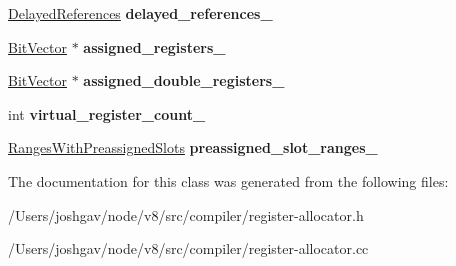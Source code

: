 \begin{DoxyCompactItemize}
\item 
\hyperlink{classv8_1_1internal_1_1_zone_vector}{Delayed\+References} {\bfseries delayed\+\_\+references\+\_\+}\hypertarget{classv8_1_1internal_1_1compiler_1_1_register_allocation_data_ae801790cb5bb3c88a7d189bdfa41f46c}{}\label{classv8_1_1internal_1_1compiler_1_1_register_allocation_data_ae801790cb5bb3c88a7d189bdfa41f46c}

\item 
\hyperlink{classv8_1_1internal_1_1_bit_vector}{Bit\+Vector} $\ast$ {\bfseries assigned\+\_\+registers\+\_\+}\hypertarget{classv8_1_1internal_1_1compiler_1_1_register_allocation_data_a637e49b748733cce53398c61b59257fd}{}\label{classv8_1_1internal_1_1compiler_1_1_register_allocation_data_a637e49b748733cce53398c61b59257fd}

\item 
\hyperlink{classv8_1_1internal_1_1_bit_vector}{Bit\+Vector} $\ast$ {\bfseries assigned\+\_\+double\+\_\+registers\+\_\+}\hypertarget{classv8_1_1internal_1_1compiler_1_1_register_allocation_data_ab1f3e5c2e62b10382bb52433aec20bd3}{}\label{classv8_1_1internal_1_1compiler_1_1_register_allocation_data_ab1f3e5c2e62b10382bb52433aec20bd3}

\item 
int {\bfseries virtual\+\_\+register\+\_\+count\+\_\+}\hypertarget{classv8_1_1internal_1_1compiler_1_1_register_allocation_data_aa86ead6a6b155c8ee4d0d13448e35adc}{}\label{classv8_1_1internal_1_1compiler_1_1_register_allocation_data_aa86ead6a6b155c8ee4d0d13448e35adc}

\item 
\hyperlink{classv8_1_1internal_1_1_zone_vector}{Ranges\+With\+Preassigned\+Slots} {\bfseries preassigned\+\_\+slot\+\_\+ranges\+\_\+}\hypertarget{classv8_1_1internal_1_1compiler_1_1_register_allocation_data_acd01fa7e93727f2ef15fba7909c5bb68}{}\label{classv8_1_1internal_1_1compiler_1_1_register_allocation_data_acd01fa7e93727f2ef15fba7909c5bb68}

\end{DoxyCompactItemize}


The documentation for this class was generated from the following files\+:\begin{DoxyCompactItemize}
\item 
/\+Users/joshgav/node/v8/src/compiler/register-\/allocator.\+h\item 
/\+Users/joshgav/node/v8/src/compiler/register-\/allocator.\+cc\end{DoxyCompactItemize}
